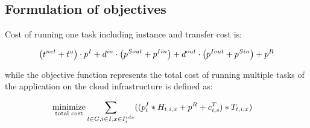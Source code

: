 {    \subsection{Formulation of objectives}
    \label{sec:workflow:problem:objective}
    
    Cost of running one task including instance and transfer cost is:

    \begin{align}
        \left(t^{net} + t^u\right) \cdot p^I + 
        d^{in} \cdot \left(p^{Sout} + p^{Iin}\right) + 
        d^{out} \cdot \left(p^{Iout} + p^{Sin}\right) + 
        p^{R}
    \end{align}

    while the objective function represents the total cost of running multiple
    tasks of the application on the cloud infrastructure is defined as:
    
    \begin{align}    
    \begin{split}
        \underset{\text{total cost}}{\text{minimize}} \sum \limits_{t \in G, i \in I, x \in I^{idx}_i}  ( & 
                    (p^I_i * H_{t,i,x} + p^{R} + c^T_{i,s})*T_{t,i,x} 
                   )
    \end{split}
    \end{align}
      
}
